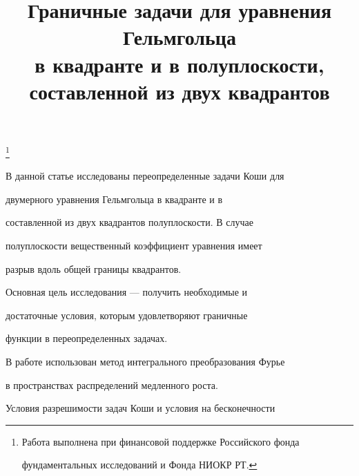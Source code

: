

\title{Граничные задачи для уравнения Гельмгольца\\


в квадранте и в полуплоскости,\\


составленной из двух квадрантов}


\thanks{Работа выполнена при финансовой поддержке Российского фонда


фундаментальных исследований и Фонда НИОКР РТ.}








\date{}




\pagestyle{plain} %







\maketitle


\label{begin}








В данной статье исследованы переопределенные задачи Коши для


двумерного уравнения Гельмгольца в квадранте и в


составленной из двух квадрантов полуплоскости. В случае


полуплоскости вещественный коэффициент уравнения имеет


разрыв вдоль общей границы квадрантов.


Основная цель исследования --- получить необходимые и


достаточные условия, которым удовлетворяют граничные


функции в переопределенных задачах.





В работе использован метод интегрального преобразования Фурье


в пространствах распределений медленного роста.


Условия разрешимости задач Коши и условия на бесконечности


